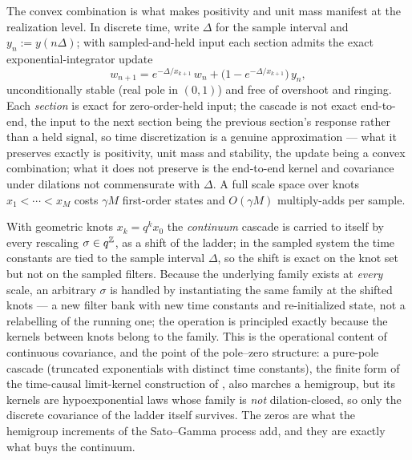 The convex combination is what makes positivity and unit mass manifest at the realization
level. In discrete time, write $\Delta$ for the sample interval and $y_n := y(n\Delta)$; with
sampled-and-held input each section admits the exact exponential-integrator update
\[
  w_{n+1} = e^{-\Delta/x_{k+1}}\, w_n + \bigl(1 - e^{-\Delta/x_{k+1}}\bigr)\, y_n ,
\]
unconditionally stable (real pole in $(0,1)$) and free of overshoot and ringing. Each
\emph{section} is exact for zero-order-held input; the cascade is not exact end-to-end, the
input to the next section being the previous section's response rather than a held signal,
so time discretization is a genuine approximation --- what it preserves exactly is
positivity, unit mass and stability, the update being a convex combination; what it does not
preserve is the end-to-end kernel and covariance under dilations not commensurate with
$\Delta$. A full scale space over knots $x_1 < \cdots < x_M$ costs $\gamma M$ first-order
states and $O(\gamma M)$ multiply-adds per sample.

\begin{remark}\label{rem:covariance-practice}
With geometric knots $x_k = q^k x_0$ the \emph{continuum} cascade is carried to itself by
every rescaling $\sigma \in q^{\mathbb{Z}}$, as a shift of the ladder; in the sampled system the
time constants are tied to the sample interval $\Delta$, so the shift is exact on the knot
set but not on the sampled filters. Because the underlying family exists at \emph{every}
scale, an arbitrary $\sigma$ is handled by instantiating the same family at the shifted
knots --- a new filter bank with new time constants and re-initialized state, not a
relabelling of the running one; the operation is principled exactly because the kernels
between knots belong to the family. This is the operational content of continuous
covariance, and the point of the pole--zero structure: a pure-pole cascade (truncated
exponentials with distinct time constants), the finite form of the time-causal limit-kernel
construction of , also marches a hemigroup, but its kernels are
hypoexponential laws whose family is \emph{not} dilation-closed, so only the discrete
covariance of the ladder itself survives. The zeros are what the hemigroup increments of the
Sato--Gamma process add, and they are exactly what buys the continuum.
\end{remark}

